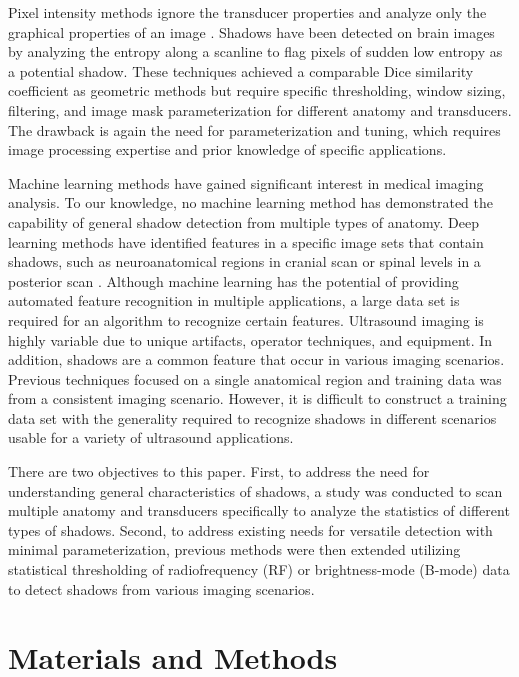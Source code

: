 \documentclass[authoryear,preprint,review,12pt]{elsarticle}
\begin{document}
Pixel intensity methods ignore the transducer properties and analyze only the graphical properties of an image \citep{Hellier2010}. Shadows have been detected on brain images by analyzing the entropy along a scanline to flag pixels of sudden low entropy as a potential shadow. These techniques achieved a comparable Dice similarity coefficient as geometric methods but require specific thresholding, window sizing, filtering, and image mask parameterization for different anatomy and transducers. The drawback is again the need for parameterization and tuning, which requires image processing expertise and prior knowledge of specific applications.

Machine learning methods have gained significant interest in medical imaging analysis. To our knowledge, no machine learning method has demonstrated the capability of general shadow detection from multiple types of anatomy. Deep learning methods have identified features in a specific image sets that contain shadows, such as neuroanatomical regions in cranial scan \citep{Milletari2017} or spinal levels in a posterior scan \citep{Hetherington2017}. Although machine learning has the potential of providing automated feature recognition in multiple applications, a large data set is required for an algorithm to recognize certain features. Ultrasound imaging is highly variable due to unique artifacts, operator techniques, and equipment. In addition, shadows are a common feature that occur in various imaging scenarios. Previous techniques focused on a single anatomical region and training data was from a consistent imaging scenario. However, it is difficult to construct a training data set with the generality required to recognize shadows in different scenarios usable for a variety of ultrasound applications.

There are two objectives to this paper. First, to address the need for understanding general characteristics of shadows, a study was conducted to scan multiple anatomy and transducers specifically to analyze the statistics of different types of shadows. Second, to address existing needs for versatile detection with minimal parameterization, previous methods were then extended utilizing statistical thresholding of radiofrequency (RF) or brightness-mode (B-mode) data to detect shadows from various imaging scenarios. 

\section*{Materials and Methods}
\label{MaM}
\end{document}
